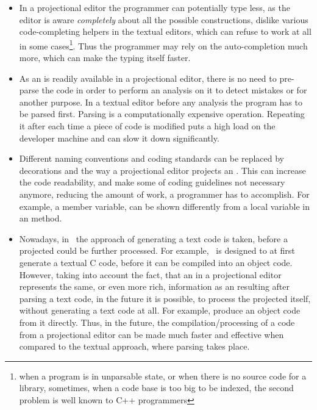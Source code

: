   \begin{itemize}
   \item In a projectional editor the programmer can potentially type less, as the editor is aware \emph{completely}
  about all the possible constructions, dislike various code-completing helpers in the textual editors, which can refuse 
  to work at all in some cases\footnote{when a program is in unparsable state, or when there is no source code for a library,
  sometimes, when a code base is too big to be indexed, the second problem is well known to C++ programmers}. 
  Thus the programmer may rely on the auto-completion much more, which
  can make the typing itself faster.

  
  \item As an  is readily available  in a projectional editor, there is no need to pre-parse the code in order to 
  perform an analysis on it to detect mistakes or for another purpose. In a textual editor before any analysis the program has to be 
  parsed first. Parsing is a computationally expensive operation. Repeating it after each time a piece of code is modified 
  puts a high load on the developer machine and can slow it down significantly. 
  
  
  \item Different naming conventions and coding standards can be replaced by decorations and the way a projectional editor
  projects an . This can increase the code readability, and make some of coding guidelines not necessary anymore,
  reducing the amount of work, a programmer has to accomplish.
  For example, a member variable, can be shown differently from a local variable in an method.
  
  \item Nowadays, in \jbmps\ the approach of generating a text code is taken, before a projected  could be further processed.
  For example, \mbdr\ is designed to at first generate a textual C code, before it can be compiled into an object code.
  However, taking into account the fact, that an  in a projectional editor represents the same, or even more rich, information 
  as an  resulting after parsing a text code, in the future it is possible, to process the projected  itself,
  without generating a text code at all. For example, produce an object code from it directly. Thus, in the future, the compilation/processing
  of a code from a projectional editor can be made much faster and effective when compared to the textual approach, where parsing takes place.
 
  
  \end{itemize}
  
